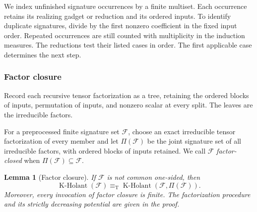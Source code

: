 \documentclass[11pt,letterpaper,onecolumn]{article}
\theoremstyle{plain}
\newtheorem{lemma}[lemma]{Lemma}
\theoremstyle{definition}
\theoremstyle{remark}
\newcommand{\cF}{\mathcal F}
\newcommand{\KHolant}{\operatorname{K\text{-}Holant}}
\newcommand{\equivT}{\equiv_{\mathrm T}}
\begin{document}
We index unfinished signature occurrences by a finite multiset.  Each
occurrence retains its realizing gadget or reduction and its ordered inputs.
To identify duplicate signatures, divide by the first nonzero coefficient
in the fixed input order.  Repeated
occurrences are still counted with multiplicity in the induction measures.
The reductions test their listed cases in order. The first applicable case
determines the next step.

\subsubsection{Factor closure}
\label{subsec:factor-saturation}

Record each recursive tensor factorization as a tree, retaining the ordered
blocks of inputs, permutation of inputs, and nonzero scalar at every split.  The leaves
are the irreducible factors.

For a preprocessed finite signature set \(\cF\), choose an exact
irreducible tensor factorization of every member and let \(\Pi(\cF)\) be the
joint signature set of all irreducible factors, with ordered blocks of inputs retained.
We call \(\cF\) \emph{factor-closed} when
\(\Pi(\cF)\subseteq\cF\).

\begin{lemma}[Factor closure]
\label{lem:factor-saturation}
If \(\cF\) is not common one-sided, then
\begin{equation}
  \KHolant(\cF)
  \equivT
  \KHolant(\cF,\Pi(\cF)).
  \label{eq:factor-saturation}
\end{equation}
Moreover, every invocation of factor closure is finite. The factorization
procedure and its strictly decreasing potential are given in the proof.
\end{lemma}
\end{document}
